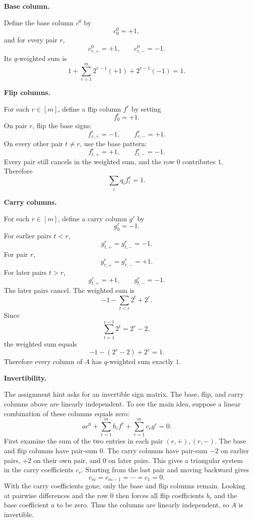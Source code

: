 \documentclass[11pt]{article}
\begin{document}
\begin{enumerate}
\begin{solutionbox}
    \medskip

    \textbf{Base column.}

    Define the base column $c^0$ by
    \[
    c^0_0=+1,
    \]
    and for every pair $r$,
    \[
    c^0_{r,+}=+1,
    \qquad
    c^0_{r,-}=-1.
    \]
    Its $q$-weighted sum is
    \[
    1+\sum_{r=1}^m2^{r-1}(+1)+2^{r-1}(-1)=1.
    \]

    \medskip

    \textbf{Flip columns.}

    For each $r\in[m]$, define a flip column $f^r$ by setting
    \[
    f^r_0=+1.
    \]
    On pair $r$, flip the base signs:
    \[
    f^r_{r,+}=-1,
    \qquad
    f^r_{r,-}=+1.
    \]
    On every other pair $t\ne r$, use the base pattern:
    \[
    f^r_{t,+}=+1,
    \qquad
    f^r_{t,-}=-1.
    \]
    Every pair still cancels in the weighted sum, and the row $0$ contributes $1$. Therefore
    \[
    \sum_i q_i f^r_i=1.
    \]

    \medskip

    \textbf{Carry columns.}

    For each $r\in[m]$, define a carry column $g^r$ by
    \[
    g^r_0=-1.
    \]
    For earlier pairs $t<r$,
    \[
    g^r_{t,+}=g^r_{t,-}=-1.
    \]
    For pair $r$,
    \[
    g^r_{r,+}=g^r_{r,-}=+1.
    \]
    For later pairs $t>r$,
    \[
    g^r_{t,+}=+1,
    \qquad
    g^r_{t,-}=-1.
    \]
    The later pairs cancel. The weighted sum is
    \[
    -1-\sum_{t<r}2^t+2^r.
    \]
    Since
    \[
    \sum_{t=1}^{r-1}2^t=2^r-2,
    \]
    the weighted sum equals
    \[
    -1-(2^r-2)+2^r=1.
    \]
    Therefore every column of $A$ has $q$-weighted sum exactly $1$.

    \medskip

    \textbf{Invertibility.}

    The assignment hint asks for an invertible sign matrix. The base, flip, and carry columns
    above are linearly independent. To see the main idea, suppose a linear combination of these
    columns equals zero:
    \[
    a c^0+\sum_{r=1}^m b_r f^r+\sum_{r=1}^m c_r g^r=0.
    \]
    First examine the sum of the two entries in each pair $(r,+),(r,-)$. The base and flip
    columns have pair-sum $0$. The carry columns have pair-sum $-2$ on earlier pairs, $+2$ on
    their own pair, and $0$ on later pairs. This gives a triangular system in the carry
    coefficients $c_r$. Starting from the last pair and moving backward gives
    \[
    c_m=c_{m-1}=\cdots=c_1=0.
    \]
    With the carry coefficients gone, only the base and flip columns remain. Looking at
    pairwise differences and the row $0$ then forces all flip coefficients $b_r$ and the base
    coefficient $a$ to be zero. Thus the columns are linearly independent, so $A$ is invertible.


\end{solutionbox}
\end{enumerate}
\end{document}
